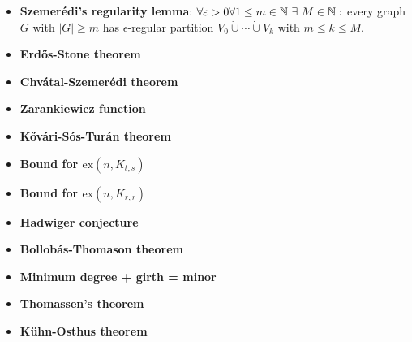 \begin{itemize}
  \item \textbf{Szemerédi's regularity lemma}: $ \forall \epsilon > 0 \forall 1 \leq m \in \N \ \exists \ M \in \N : $ every graph $ G $ with $ \vert G \vert \geq m $ has $ \epsilon $-regular partition $ V_0 \dot{\cup} \cdots \dot{\cup} V_k $ with $ m \leq k \leq M $.
  \item \textbf{Erd\H{o}s-Stone theorem}
  \item \textbf{Chvátal-Szemerédi theorem}
  \item \textbf{Zarankiewicz function}
  \item \textbf{K\H{o}vári-Sós-Turán theorem}
  \item \textbf{Bound for $ \text{ex}(n,K_{t,s}) $}
  \item \textbf{Bound for $ \text{ex}(n,K_{r,r}) $}
  \item \textbf{Hadwiger conjecture}
  \item \textbf{Bollobás-Thomason theorem}
  \item \textbf{Minimum degree + girth = minor}
  \item \textbf{Thomassen's theorem}
  \item \textbf{Kühn-Osthus theorem}
\end{itemize}